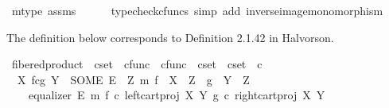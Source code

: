 \begin{isabellebody}
\ m{\isacharunderscore}{\kern0pt}type\ assms\isanewline
\ \ \ \ \isamarkupfalse%
\ {\isacharparenleft}{\kern0pt}typecheck{\isacharunderscore}{\kern0pt}cfuncs{\isacharcomma}{\kern0pt}\ simp\ add{\isacharcolon}{\kern0pt}\ inverse{\isacharunderscore}{\kern0pt}image{\isacharunderscore}{\kern0pt}monomorphism{\isacharparenright}{\kern0pt}\isanewline
{}\isamarkupfalse%
%
\endisatagproof
{\isafoldproof}%
%
\isadelimproof
%
\endisadelimproof
%
\isadelimdocument
%
\endisadelimdocument
%
\isatagdocument
%
\isamarkuptrue%
%
\endisatagdocument
{\isafolddocument}%
%
\isadelimdocument
%
\endisadelimdocument
%
\begin{isamarkuptext}%
The definition below corresponds to Definition 2.1.42 in Halvorson.%
\end{isamarkuptext}\isamarkuptrue%
\isamarkupfalse%
\ fibered{\isacharunderscore}{\kern0pt}product\ {\isacharcolon}{\kern0pt}{\isacharcolon}{\kern0pt}\ {\isachardoublequoteopen}cset\ {\isasymRightarrow}\ cfunc\ {\isasymRightarrow}\ cfunc\ {\isasymRightarrow}\ cset\ {\isasymRightarrow}\ cset{\isachardoublequoteclose}\ {\isacharparenleft}{\kern0pt}{\isachardoublequoteopen}{\isacharunderscore}{\kern0pt}\ \isactrlbsub {\isacharunderscore}{\kern0pt}\isactrlesub {\isasymtimes}\isactrlsub c\isactrlbsub {\isacharunderscore}{\kern0pt}\isactrlesub \ {\isacharunderscore}{\kern0pt}{\isachardoublequoteclose}\ {\isacharbrackleft}{\kern0pt}{}{}{\isacharcomma}{\kern0pt}{}{}{\isacharcomma}{\kern0pt}{}{}{\isacharcomma}{\kern0pt}{}{}{\isacharbrackright}{\kern0pt}{}{}{\isacharparenright}{\kern0pt}\ \isanewline
\ \ {\isachardoublequoteopen}X\ \isactrlbsub f\isactrlesub {\isasymtimes}\isactrlsub c\isactrlbsub g\isactrlesub \ Y\ {\isacharequal}{\kern0pt}\ {\isacharparenleft}{\kern0pt}SOME\ E{\isachardot}{\kern0pt}\ {\isasymexists}\ Z\ m{\isachardot}{\kern0pt}\ f\ {\isacharcolon}{\kern0pt}\ X\ {\isasymrightarrow}\ Z\ {\isasymand}\ g\ {\isacharcolon}{\kern0pt}\ Y\ {\isasymrightarrow}\ Z\ {\isasymand}\isanewline
\ \ \ \ equalizer\ E\ m\ {\isacharparenleft}{\kern0pt}f\ {\isasymcirc}\isactrlsub c\ left{\isacharunderscore}{\kern0pt}cart{\isacharunderscore}{\kern0pt}proj\ X\ Y{\isacharparenright}{\kern0pt}\ {\isacharparenleft}{\kern0pt}g\ {\isasymcirc}\isactrlsub c\ right{\isacharunderscore}{\kern0pt}cart{\isacharunderscore}{\kern0pt}proj\ X\ Y{\isacharparenright}{\kern0pt}{\isacharparenright}{\kern0pt}{\isachardoublequoteclose}\isanewline

\end{isabellebody}
